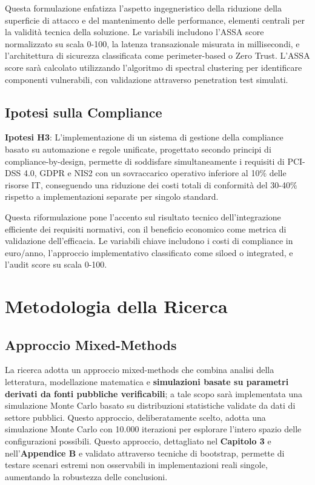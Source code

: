 \documentclass[12pt,a4paper,oneside]{book}
\numberwithin{figure}{chapter} %
\numberwithin{table}{chapter}  %
\begin{document}
Questa formulazione enfatizza l'aspetto ingegneristico della riduzione della superficie di attacco e del mantenimento delle performance, elementi centrali per la validità tecnica della soluzione. Le variabili includono l'ASSA score normalizzato su scala 0-100, la latenza transazionale misurata in millisecondi, e l'architettura di sicurezza classificata come perimeter-based o Zero Trust.
L'ASSA score sarà calcolato utilizzando l'algoritmo di spectral clustering per identificare componenti vulnerabili, con validazione attraverso penetration test simulati.

\subsection{\texorpdfstring{\textbf{Ipotesi sulla
Compliance}}{1.4.3 Ipotesi sulla Compliance}}\label{ipotesi-sulla-compliance}

\textbf{Ipotesi H3}: L'implementazione di un sistema di gestione della compliance basato su automazione e regole unificate, progettato secondo principi di compliance-by-design, permette di soddisfare simultaneamente i requisiti di PCI-DSS 4.0, GDPR e NIS2 con un sovraccarico operativo inferiore al 10\% delle risorse IT, conseguendo una riduzione dei costi
totali di conformità del 30-40\% rispetto a implementazioni separate per singolo standard.

Questa riformulazione pone l'accento sul risultato tecnico
dell'integrazione efficiente dei requisiti normativi, con il beneficio economico come metrica di validazione dell'efficacia. Le variabili chiave includono i costi di compliance in euro/anno, l'approccio implementativo classificato come siloed o integrated, e l'audit score su scala 0-100.

\section{\texorpdfstring{\textbf{Metodologia della
Ricerca}}{1.5 Metodologia della Ricerca}}\label{metodologia-della-ricerca}

\subsection{\texorpdfstring{\textbf{Approccio
Mixed-Methods}}{1.5.1 Approccio Mixed-Methods}}\label{approccio-mixed-methods}

La ricerca adotta un approccio mixed-methods che combina analisi della letteratura, modellazione matematica e \textbf{simulazioni basate su parametri derivati da fonti pubbliche verificabili}; a tale scopo sarà implementata una simulazione Monte Carlo basato su distribuzioni statistiche validate da dati di settore pubblici. 
Questo approccio, deliberatamente scelto, adotta una simulazione 
Monte Carlo con 10.000 iterazioni per esplorare l'intero spazio delle configurazioni possibili. Questo approccio, dettagliato nel \textbf{Capitolo 3} e nell'\textbf{Appendice B} e validato attraverso tecniche di bootstrap, permette di testare scenari estremi non osservabili in implementazioni reali singole, aumentando la robustezza delle conclusioni.
\end{document}
